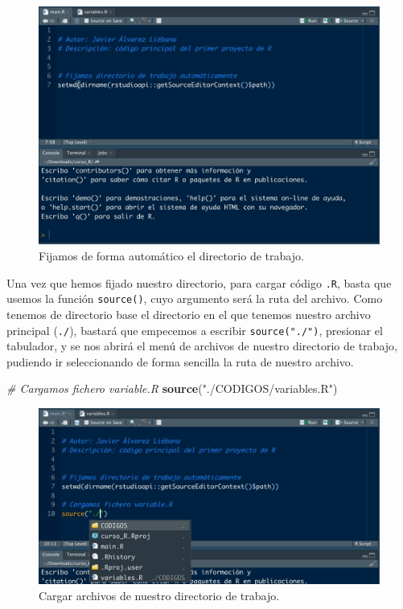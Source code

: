 \documentclass[11pt,]{book}
\newenvironment{Shaded}{\begin{snugshade}}{\end{snugshade}}
\newcommand{\CommentTok}[1]{\textcolor[rgb]{0.37,0.37,0.37}{\textit{#1}}}
\newcommand{\KeywordTok}[1]{\textcolor[rgb]{0.27,0.27,0.27}{\textbf{#1}}}
\newcommand{\NormalTok}[1]{#1}
\newcommand{\OperatorTok}[1]{\textcolor[rgb]{0.43,0.43,0.43}{\textbf{#1}}}
\newcommand{\StringTok}[1]{\textcolor[rgb]{0.5,0.5,0.5}{#1}}
\begin{document}
\begin{Shaded}
\end{Shaded}

\begin{figure}

{\centering \includegraphics[width=0.5\linewidth]{./img/setwd} 

}

\caption{Fijamos de forma automático el directorio de trabajo.}\label{fig:setwd}
\end{figure}

Una vez que hemos fijado nuestro directorio, para cargar código \texttt{.R}, basta que usemos la función \texttt{source()}, cuyo argumento será la ruta del archivo. Como tenemos de directorio base el directorio en el que tenemos nuestro archivo principal (\texttt{./}), bastará que empecemos a escribir \texttt{source("./")}, presionar el tabulador, y se nos abrirá el menú de archivos de nuestro directorio de trabajo, pudiendo ir seleccionando de forma sencilla la ruta de nuestro archivo.

\begin{Shaded}
\begin{Highlighting}[]
\CommentTok{# Cargamos fichero variable.R}
\KeywordTok{source}\NormalTok{(}\StringTok{"./CODIGOS/variables.R"}\NormalTok{)}
\end{Highlighting}
\end{Shaded}

\begin{figure}

{\centering \includegraphics[width=0.5\linewidth]{./img/menu_carpetas} 

}

\caption{Cargar archivos de nuestro directorio de trabajo.}\label{fig:menu-carpetas}
\end{figure}
\end{document}
